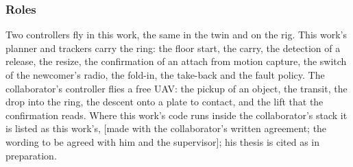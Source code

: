 \subsubsection{Roles}
\label{sec:roles}

Two controllers fly in this work, the same in the twin and on the rig. This work's planner and trackers carry the
ring: the floor start, the carry, the detection of a release, the resize, the confirmation of an attach from motion
capture, the switch of the newcomer's radio, the fold-in, the take-back and the fault policy. The collaborator's
controller flies a free UAV: the pickup of an object, the transit, the drop into the ring, the descent onto a plate to
contact, and the lift that the confirmation reads. Where this work's code runs inside the collaborator's stack it is
listed as this work's, [made with the collaborator's written agreement; the wording to be agreed with him and the
supervisor]; his thesis is cited as in preparation.
